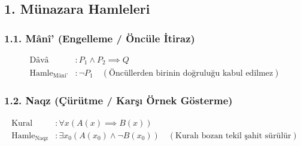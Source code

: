 \documentclass[11pt, a4paper]{article}
\begin{document}
\subsection{1. Münazara Hamleleri}

\subsubsection{1.1. Mânî' (Engelleme / Öncüle İtiraz)}
\begin{align}
\text{Dâvâ} &: P_1 \land P_2 \implies Q \\
\text{Hamle}_{\text{Mâni'}} &: \neg P_1 \quad (\text{Öncüllerden birinin doğruluğu kabul edilmez})
\end{align}

\subsubsection{1.2. Naqz (Çürütme / Karşı Örnek Gösterme)}
\begin{align}
\text{Kural} &: \forall x (A(x) \implies B(x)) \\
\text{Hamle}_{\text{Naqz}} &: \exists x_0 (A(x_0) \land \neg B(x_0)) \quad (\text{Kuralı bozan tekil şahit sürülür})
\end{align}
\end{document}
